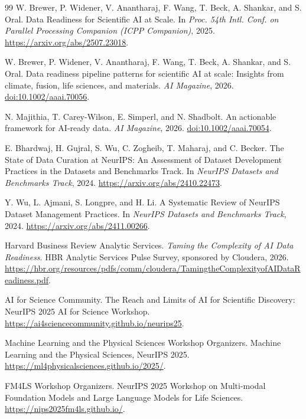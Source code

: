 \documentclass[10pt]{article}
\begin{document}
\begin{thebibliography}{99}
W. Brewer, P. Widener, V. Anantharaj, F. Wang, T. Beck, A. Shankar, and S. Oral.
\newblock Data Readiness for Scientific AI at Scale.
\newblock In \emph{Proc. 54th Intl. Conf. on Parallel Processing Companion (ICPP Companion)}, 2025.
\newblock \url{https://arxiv.org/abs/2507.23018}.

W. Brewer, P. Widener, V. Anantharaj, F. Wang, T. Beck, A. Shankar, and S. Oral.
\newblock Data readiness pipeline patterns for scientific AI at scale: Insights from climate, fusion, life sciences, and materials.
\newblock \emph{AI Magazine}, 2026. \href{https://doi.org/10.1002/aaai.70056}{doi:10.1002/aaai.70056}.

N. Majithia, T. Carey-Wilson, E. Simperl, and N. Shadbolt.
\newblock An actionable framework for AI-ready data.
\newblock \emph{AI Magazine}, 2026. \href{https://doi.org/10.1002/aaai.70054}{doi:10.1002/aaai.70054}.

E. Bhardwaj, H. Gujral, S. Wu, C. Zogheib, T. Maharaj, and C. Becker.
\newblock The State of Data Curation at NeurIPS: An Assessment of Dataset Development Practices in the Datasets and Benchmarks Track.
\newblock In \emph{NeurIPS Datasets and Benchmarks Track}, 2024. \url{https://arxiv.org/abs/2410.22473}.

Y. Wu, L. Ajmani, S. Longpre, and H. Li.
\newblock A Systematic Review of NeurIPS Dataset Management Practices.
\newblock In \emph{NeurIPS Datasets and Benchmarks Track}, 2024. \url{https://arxiv.org/abs/2411.00266}.

Harvard Business Review Analytic Services.
\newblock \emph{Taming the Complexity of AI Data Readiness}.
\newblock HBR Analytic Services Pulse Survey, sponsored by Cloudera, 2026.
\newblock \url{https://hbr.org/resources/pdfs/comm/cloudera/TamingtheComplexityofAIDataReadiness.pdf}.

AI for Science Community.
\newblock The Reach and Limits of AI for Scientific Discovery: NeurIPS 2025 AI for Science Workshop.
\newblock \url{https://ai4sciencecommunity.github.io/neurips25}.

Machine Learning and the Physical Sciences Workshop Organizers.
\newblock Machine Learning and the Physical Sciences, NeurIPS 2025.
\newblock \url{https://ml4physicalsciences.github.io/2025/}.

FM4LS Workshop Organizers.
\newblock NeurIPS 2025 Workshop on Multi-modal Foundation Models and Large Language Models for Life Sciences.
\newblock \url{https://nips2025fm4ls.github.io/}.


\end{thebibliography}
\end{document}
